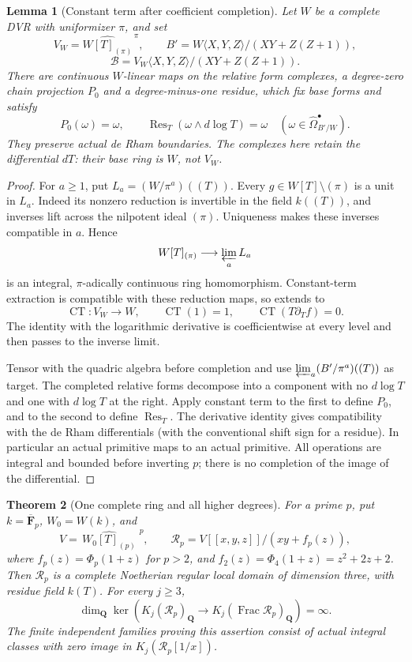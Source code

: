 \documentclass[11pt,a4paper]{article}
\newtheorem{theorem}{Theorem}[section]
\newtheorem{lemma}[theorem]{Lemma}
\theoremstyle{remark}
\newcommand{\Q}{\mathbf Q}
\newcommand{\F}{\mathbf F}
\newcommand{\Frac}{\operatorname{Frac}}
\begin{document}
\begin{lemma}[Constant term after coefficient completion]
\label{lem:completedcoefficientresidue}
Let $W$ be a complete DVR with uniformizer $\pi$, and set
\[
 V_W=\widehat{W[T]_{(\pi)}}^{\,\pi},\qquad
 B'=W\langle X,Y,Z\rangle/(XY+Z(Z+1)),
\]
\[
 \mathcal B=V_W\langle X,Y,Z\rangle/(XY+Z(Z+1)).
\]
There are continuous $W$-linear maps on the relative form complexes,
a degree-zero chain projection $P_0$ and a degree-minus-one residue,
which fix base forms and satisfy
\[
 P_0(\omega)=\omega,\qquad
 \operatorname{Res}_T(\omega\wedge d\log T)=\omega
 \quad(\omega\in\widehat\Omega^\bullet_{B'/W}).
\]
They preserve actual de Rham boundaries. The complexes here retain
the differential $dT$: their base ring is $W$, not $V_W$.
\end{lemma}

\begin{proof}
For $a\geq1$, put $L_a=(W/\pi^a)((T))$.
Every $g\in W[T]\setminus(\pi)$ is a unit in $L_a$.
Indeed its nonzero reduction is invertible in the field
$k((T))$, and inverses lift across the nilpotent ideal $(\pi)$.
Uniqueness makes these inverses compatible in $a$. Hence
\[
 W[T]_{(\pi)}\longrightarrow\varprojlim_a L_a
\]
is an integral, $\pi$-adically continuous ring homomorphism.
Constant-term extraction is compatible with these reduction maps,
so extends to
\[
 \operatorname{CT}:V_W\longrightarrow W,\qquad
 \operatorname{CT}(1)=1,\qquad
 \operatorname{CT}(T\partial_T f)=0.
\]
The identity with the logarithmic derivative is coefficientwise
at every level and then passes to the inverse limit.

Tensor with the quadric algebra before completion and use
$\varprojlim_a(B'/\pi^a)((T))$ as target.  The completed relative
forms decompose into a component with no $d\log T$ and one
with $d\log T$ at the right. Apply constant term to the first
to define $P_0$, and to the second to define
$\operatorname{Res}_T$.
The derivative identity gives compatibility with the de Rham
differentials (with the conventional shift sign for a residue).
In particular an actual primitive maps to an actual primitive.
All operations are integral and bounded before inverting $p$;
there is no completion of the image of the differential.
\end{proof}

\begin{theorem}[One complete ring and all higher degrees]
\label{thm:completedfixedalldegree}
For a prime $p$, put $k=\overline{\F}_p$, $W_0=W(k)$, and
\[
 V=\widehat{\,W_0[T]_{(p)}\,}^{\,p},\qquad
 \mathcal R_p=V[[x,y,z]]/(xy+f_p(z)),
\]
where $f_p(z)=\Phi_p(1+z)$ for $p>2$, and
$f_2(z)=\Phi_4(1+z)=z^2+2z+2$.
Then $\mathcal R_p$ is a complete Noetherian regular local
domain of dimension three, with residue field $k(T)$.
For every $j\geq3$,
\[
 \dim_{\Q}\ker\left(K_j(\mathcal R_p)_{\Q}
          \longrightarrow K_j(\Frac\mathcal R_p)_{\Q}\right)
 =\infty.
\]
The finite independent families proving this assertion consist
of actual integral classes with zero image in
$K_j(\mathcal R_p[1/x])$.
\end{theorem}
\end{document}
